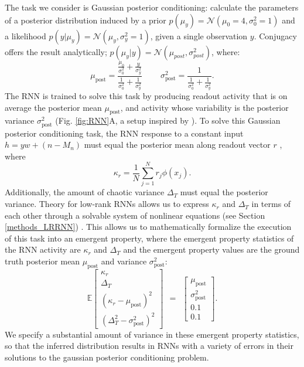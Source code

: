 \documentclass[11pt]{article}
\begin{document}
The task we consider is Gaussian posterior conditioning: calculate the parameters of a posterior distribution induced by a prior $p(\mu_y) = \mathcal{N}(\mu_0=4, \sigma_0^2=1)$ and a likelihood $p(y | \mu_y) = \mathcal{N}(\mu_y,\sigma^2_y = 1)$, given a single observation $y$.  Conjugacy offers the result analytically; $p(\mu_y | y ) = \mathcal{N}\left(\mu_{post},\sigma_{post}^2\right)$, where:   
\begin{equation}
\mu_{\text{post}} = \frac{\frac{\mu_0}{\sigma_0^2} + \frac{y}{\sigma_y^2}}{\frac{1}{\sigma_0^2} + \frac{1}{\sigma_y^2}}
~~~~~~~~~~
 \sigma^2_{\text{post}} = \frac{1}{\frac{1}{\sigma_0^2} + \frac{1}{\sigma_y^2}}.
\end{equation} 
The RNN is trained to solve this task by producing readout activity that is on average the posterior mean $\mu_{\text{post}}$, and activity whose variability is the posterior variance $\sigma^2_{\text{post}}$ (Fig. \ref{fig:RNN}A, a setup inspired by \cite{echeveste2019cortical}). 
To solve this Gaussian posterior conditioning task, the RNN response to a constant input $h = y w + (n-M_n)$ must equal the posterior mean along readout vector $r$ , where
\begin{equation}
\kappa_r =  \frac{1}{N} \sum_{j=1}^N r_j \phi(x_j).
\end{equation}
Additionally, the amount of chaotic variance $\Delta_T$ must equal the posterior variance.
Theory for low-rank RNNs allows us to express $\kappa_r$ and $\Delta_T$ in terms of each other through a solvable system of nonlinear equations  (see Section \ref{methods_LRRNN}) \cite{mastrogiuseppe2018linking}.
This allows us to mathematically formalize the execution of this task into an emergent property, where the emergent property statistics of the RNN activity are $\kappa_r$ and $\Delta_T$ and the emergent property values are the ground truth posterior mean $\mu_{\text{post}}$ and variance $\sigma^2_{\text{post}}$:
\begin{equation}
\mathbb{E} \begin{bmatrix} \kappa_r \\ \Delta_T \\ (\kappa_r-\mu_{\text{post}})^2 \\ (\Delta_T^2-\sigma^2_{\text{post}})^2 \end{bmatrix} ~~=~~ \begin{bmatrix} \mu_{\text{post}} \\ \sigma^2_{\text{post}} \\ 0.1 \\ 0.1 \end{bmatrix}.
\end{equation}
We specify a substantial amount of variance in these emergent property statistics, so that the inferred distribution results in RNNs with a variety of errors in their solutions to the gaussian posterior conditioning problem. 
\end{document}
